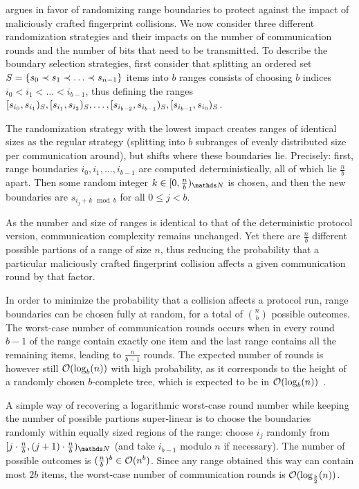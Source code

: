  argues in favor of randomizing range boundaries to protect against the impact of maliciously crafted fingerprint collisions. We now consider three different randomization strategies and their impacts on the number of communication rounds and the number of bits that need to be transmitted. To describe the boundary selection strategies, first consider that splitting an ordered set $S = \{s_0 \prec s_1 \prec \ldots \prec s_{n - 1}\}$ items into $b$ ranges consists of choosing $b$ indices $i_0 < i_1 < \ldots < i_{b-1}$, thus defining the ranges $[{s_{i_0}},{s_{i_1}})_{S}, [{s_{i_1}},{s_{i_2}})_{S}, \ldots, [{s_{i_{b - 2}}},{s_{i_{b - 1}}})_{S}, [{s_{i_{b - 1}}},{s_{i_0}})_{S}$.

The randomization strategy with the lowest impact creates ranges of identical sizes as the regular strategy (splitting into $b$ subranges of evenly distributed size per communication around), but shifts where these boundaries lie. Precisely: first, range boundaries $i_0, i_1, \ldots, i_{b - 1}$ are computed deterministically, all of which lie $\frac{n}{b}$ apart. Then some random integer $k \in \range{0}{\frac{n}{b}}{\N}$ is chosen, and then the new boundaries are $s_{i_j + k \mod b}$ for all $0 \leq j < b$.

 As the number and size of ranges is identical to that of the deterministic protocol version, communication complexity remains unchanged. Yet there are $\frac{n}{b}$ different possible partions of a range of size $n$, thus reducing the probability that a particular maliciously crafted fingerprint collision affects a given communication round by that factor.

In order to minimize the probability that a collision affects a protocol run, range boundaries can be chosen fully at random, for a total of $\binom{n}{b}$ possible outcomes. The worst-case number of communication rounds occurs when in every round $b-1$ of the range contain exactly one item and the last range contains all the remaining items, leading to $\frac{n}{b - 1}$ rounds. The expected number of rounds is however still $\mathcal{O}(\log_b(n))$ with high probability, as it corresponds to the height of a randomly chosen $b$-complete tree, which is expected to be in $\mathcal{O}(\log_b(n))$~\cite{devroye1990height}.

A simple way of recovering a logarithmic worst-case round number while keeping the number of possible partions super-linear is to choose the boundaries randomly within equally sized regions of the range: choose $i_j$ randomly from $\range{j \cdot \frac{n}{b}}{(j + 1) \cdot \frac{n}{b}}{\N}$ (and take $i_{b - 1}$ modulo $n$ if necessary). The number of possible outcomes is $(\frac{n}{b})^b \in \mathcal{O}(n^b)$. Since any range obtained this way can contain most $2b$ items, the worst-case number of communication rounds is $\mathcal{O}(\log_{\frac{b}{2}}(n))$.

